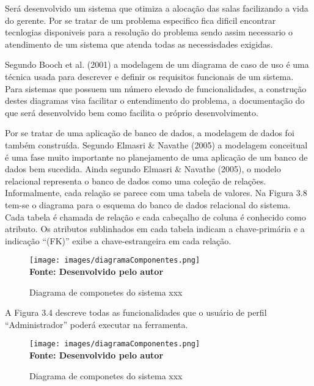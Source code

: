 
Será desenvolvido um sistema que otimiza a alocação das salas facilizando a vida do gerente. Por se tratar de um problema especifico fica dificil encontrar tecnlogias disponiveis para a resolução do problema sendo assim necessario o atendimento de um sistema que atenda todas as necessisdades exigidas.


Segundo Booch et al. (2001) a modelagem de um diagrama de caso de uso é uma
técnica usada para descrever e definir os requisitos funcionais de um sistema. Para sistemas
que possuem um número elevado de funcionalidades, a construção destes diagramas visa
facilitar o entendimento do problema, a documentação do que será desenvolvido bem
como facilita o próprio desenvolvimento.



Por se tratar de uma aplicação de banco de dados, a modelagem de dados foi
também construída. Segundo Elmasri & Navathe (2005) a modelagem conceitual é uma
fase muito importante no planejamento de uma aplicação de um banco de dados bem
sucedida.
Ainda segundo Elmasri & Navathe (2005), o modelo relacional representa o banco
de dados como uma coleção de relações. Informalmente, cada relação se parece com uma
tabela de valores.
Na Figura 3.8 tem-se o diagrama para o esquema do banco de dados relacional do
sistema. Cada tabela é chamada de relação e cada cabeçalho de coluna é conhecido como
atributo. Os atributos sublinhados em cada tabela indicam a chave-primária e a indicação
“(FK)” exibe a chave-estrangeira em cada relação.

\begin{figure}[!htb]
\caption[Diagrama de componetes do sistema xxx]{Diagrama de componetes do sistema xxx}
\label{fig:figura1}
\centering
\texttt{[image: images/diagramaComponentes.png]}
\\ \textbf{\footnotesize Fonte: Desenvolvido pelo autor}
\end{figure}




A Figura 3.4 descreve todas as funcionalidades que o usuário de perfil
“Administrador” poderá executar na ferramenta.


\begin{figure}[!htb]
\caption[Diagrama de componetes do sistema xxx]{Diagrama de componetes do sistema xxx}
\label{fig:figura1}
\centering
\texttt{[image: images/diagramaComponentes.png]}
\\ \textbf{\footnotesize Fonte: Desenvolvido pelo autor}
\end{figure}

